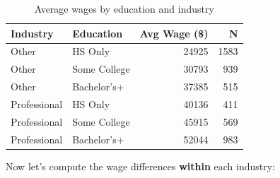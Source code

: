 \documentclass[
  letterpaper,
  DIV=11,
  numbers=noendperiod]{scrreprt}
\newenvironment{Shaded}{\begin{snugshade}}{\end{snugshade}}
\newcommand{\AttributeTok}[1]{\textcolor[rgb]{0.40,0.45,0.13}{#1}}
\newcommand{\DecValTok}[1]{\textcolor[rgb]{0.68,0.00,0.00}{#1}}
\newcommand{\FunctionTok}[1]{\textcolor[rgb]{0.28,0.35,0.67}{#1}}
\newcommand{\NormalTok}[1]{\textcolor[rgb]{0.00,0.23,0.31}{#1}}
\newcommand{\OtherTok}[1]{\textcolor[rgb]{0.00,0.23,0.31}{#1}}
\newcommand{\SpecialCharTok}[1]{\textcolor[rgb]{0.37,0.37,0.37}{#1}}
\newcommand{\StringTok}[1]{\textcolor[rgb]{0.13,0.47,0.30}{#1}}
\begin{document}
\begin{Shaded}
\end{Shaded}

{

\begin{longtable}[]{@{}llrr@{}}

\caption{\label{tbl-matching-detailed}Average wages by education and
industry}

\tabularnewline

\toprule\noalign{}
Industry & Education & Avg Wage (\$) & N \\
\midrule\noalign{}
\endhead
\bottomrule\noalign{}
\endlastfoot
Other & HS Only & 24925 & 1583 \\
Other & Some College & 30793 & 939 \\
Other & Bachelor's+ & 37385 & 515 \\
Professional & HS Only & 40136 & 411 \\
Professional & Some College & 45915 & 569 \\
Professional & Bachelor's+ & 52044 & 983 \\

\end{longtable}

}

Now let's compute the wage differences \textbf{within} each industry:
\end{document}
